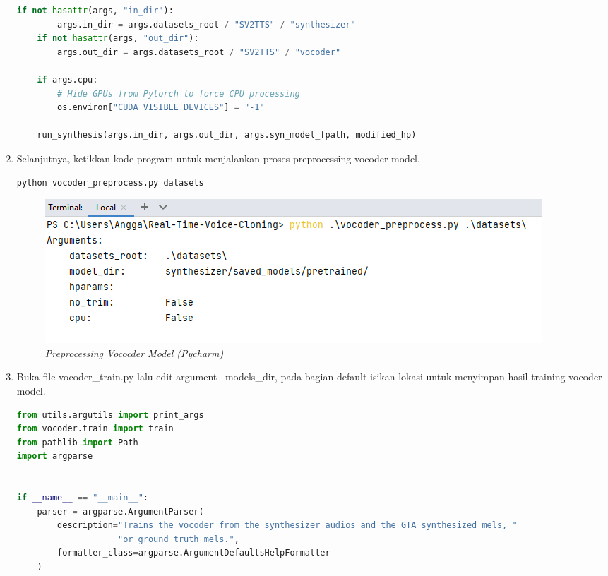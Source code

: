\begin{enumerate}
\begin{lstlisting}[language=Python, caption=Vocoder Preprocess (Pycharm)]
    if not hasattr(args, "in_dir"):
        args.in_dir = args.datasets_root / "SV2TTS" / "synthesizer"
    if not hasattr(args, "out_dir"):
        args.out_dir = args.datasets_root / "SV2TTS" / "vocoder"

    if args.cpu:
        # Hide GPUs from Pytorch to force CPU processing
        os.environ["CUDA_VISIBLE_DEVICES"] = "-1"

    run_synthesis(args.in_dir, args.out_dir, args.syn_model_fpath, modified_hp)
\end{lstlisting}

\item Selanjutnya, ketikkan kode program untuk menjalankan proses preprocessing vocoder model. 

\begin{lstlisting}[language=Python, caption=Preprocessing Vococder Model (Pycharm)]
python vocoder_preprocess.py datasets
\end{lstlisting}

\begin{figure}[H]
    \centering
    \includegraphics[scale=0.45]{figures/dataset6}
    \caption{\textit{Preprocessing Vococder Model (Pycharm)}}
    \label{dataset6}
\end{figure}

\item Buka file vocoder\_train.py lalu edit argument --models\_dir, pada bagian default isikan lokasi untuk menyimpan hasil training vocoder model.

\begin{lstlisting}[language=Python, caption=Vocoder Train (Pycharm)]
from utils.argutils import print_args
from vocoder.train import train
from pathlib import Path
import argparse


if __name__ == "__main__":
    parser = argparse.ArgumentParser(
        description="Trains the vocoder from the synthesizer audios and the GTA synthesized mels, "
                    "or ground truth mels.",
        formatter_class=argparse.ArgumentDefaultsHelpFormatter
    )
    

\end{lstlisting}
\end{enumerate}
